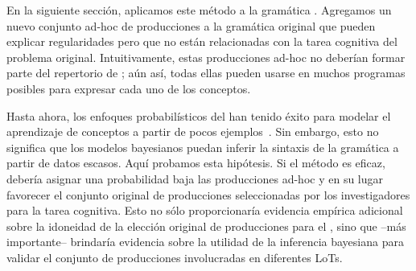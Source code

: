
En la siguiente sección, aplicamos este método a la gramática \gramgeo. Agregamos un nuevo conjunto ad-hoc de producciones a la gramática original que pueden explicar regularidades pero que no están relacionadas con la tarea cognitiva del problema original. Intuitivamente, estas producciones ad-hoc no deberían formar parte del repertorio de \gramgeo; aún así, todas ellas pueden usarse en muchos programas posibles para expresar cada uno de los conceptos.


Hasta ahora, los enfoques probabilísticos del \lot han tenido éxito para modelar el aprendizaje de conceptos a partir de pocos ejemplos~\cite{tenenbaum2011grow,piantadosi2016four}. Sin embargo, esto no significa que los modelos bayesianos puedan inferir la sintaxis de la gramática a partir de datos escasos. Aquí probamos esta hipótesis. Si el método es eficaz, debería asignar una probabilidad baja las producciones ad-hoc y en su lugar favorecer el conjunto original de producciones seleccionadas por los investigadores para la tarea cognitiva. Esto no sólo proporcionaría evidencia empírica adicional sobre la idoneidad de la elección original de producciones para el \lot, sino que --más importante-- brindaría evidencia sobre la utilidad de la inferencia bayesiana para validar el conjunto de producciones involucradas en diferentes LoTs. 

